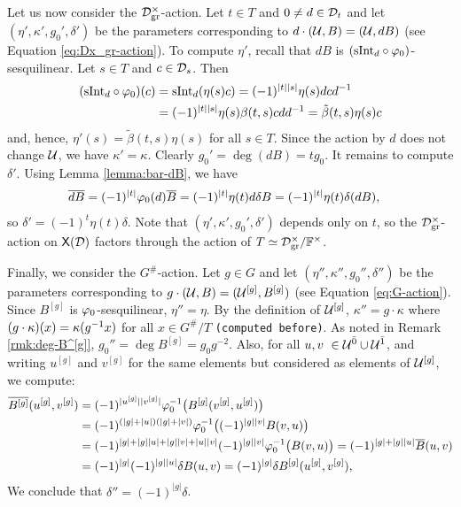 Let us now consider the $\mathcal{D}^\times_{\mathrm{gr}}$-action. 
Let $t\in T$ and $0\neq d \in \mathcal{D}_t$ and let $(\eta', \kappa', g_0', \delta')$ be the parameters corresponding to $d \cdot (\mathcal U, B) = (\mathcal U, d B)$ (see Equation \eqref{eq:Dx_gr-action}). 
To compute $\eta'$, recall that $dB$ is $(\mathrm{sInt}_d \circ \varphi_0)$-sesquilinear. 
Let $s\in T$ and $c \in \mathcal{D}_s$. 
Then
\begin{align*}
    (\mathrm{sInt}_{d} \circ \varphi_0) (c) &= \mathrm{sInt}_{d} ( \eta(s) c ) = (-1)^{|t||s|} \eta(s) d c d^{-1}\\
    &= (-1)^{|t||s|} \eta(s) \beta(t,s) c d d^{-1} = \tilde{\beta} (t,s) \eta(s) c
\end{align*}
and, hence, $\eta' (s) = \tilde{\beta} (t,s) \eta(s)$ for all $s\in T$. 
Since the action by $d$ does not change $\mathcal U$, we have $\kappa' = \kappa$. 
Clearly $g_0' = \deg (dB) = t g_0$. 
It remains to compute $\delta'$. 
Using Lemma \ref{lemma:bar-dB}, we have 
\begin{align*}
    \overline{d B} &= (-1)^{|t|} \varphi_0(d) \overline{B} = (-1)^{|t|} \eta(t) d \delta B = (-1)^{|t|} \eta(t) \delta (d B),
\end{align*}
so $\delta' = (-1)^{t} \eta(t) \delta$. 
Note that $(\eta', \kappa', g_0', \delta')$ depends only on $t$, so the $\mathcal{D}^\times_\mathrm{gr}$-action on $\mathsf{X}(\mathcal{D})$ factors through the action of $T \simeq \mathcal{D}^\times_\mathrm{gr}/\mathbb{F}^\times$.

Finally, we consider the $G^\#$-action. 
Let $g\in G$ and let $(\eta'', \kappa'', g_0'', \delta'')$ be the parameters corresponding to $g \cdot (\mathcal U, B) = (\mathcal U^{[g]}, B^{[g]})$ (see Equation \eqref{eq:G-action}). 
Since $B^{[g]}$ is $\varphi_0$-sesquilinear, $\eta'' = \eta$. By the definition of $\mathcal U^{[g]}$, $\kappa'' = g\cdot \kappa$ where $(g\cdot \kappa) (x) = \kappa(g^{-1} x)$ for all $x\in G^\#/T$ {\tt (computed before)}. 
As noted in Remark \ref{rmk:deg-B^[g]}, $g_0'' = \deg B^{[g]} = g_0 g^{-2}$. 
Also, for all $u, v\ \in \mathcal U^{\bar0} \cup \mathcal U^{\bar1}$, and writing $u^{[g]}$ and $v^{[g]}$ for the same elements but considered as elements of $\mathcal U^{[g]}$, we compute: 
\begin{align*}
    \overline{B^{[g]}}(u^{[g]},v^{[g]}) &= (-1)^{|u^{[g]}||v^{[g]}|} \varphi_0^{-1} \big( B^{[g]} (v^{[g]}, u^{[g]}) \big) \\
    &= (-1)^{(|g| + |u|) (|g| + |v|)} \varphi_0^{-1} \big( (-1)^{|g||v|} B(v, u) \big) \\
    &= (-1)^{|g| + |g||u| + |g||v| + |u||v|} (-1)^{|g||v|} \varphi_0^{-1} \big(B(v, u) \big) = (-1)^{|g| + |g||u|} \overline B(u,v) \\
    &= (-1)^{|g|} (-1)^{|g||u|} \delta B(u,v) = (-1)^{|g|} \delta B^{[g]}(u^{[g]},v^{[g]}),
\end{align*}
We conclude that $\delta'' = (-1)^{|g|} \delta$. 

